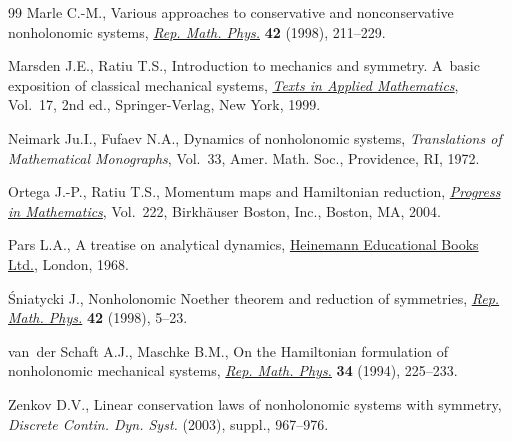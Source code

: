 \documentclass[pdftex]{sigma}
\numberwithin{equation}{section}
\begin{document}
\begin{thebibliography}{99}
Marle C.-M., Various approaches to conservative and nonconservative nonholonomic
  systems, \href{http://dx.doi.org/10.1016/S0034-4877(98)80011-6}{\textit{Rep. Math. Phys.}} \textbf{42} (1998), 211--229.

Marsden J.E., Ratiu T.S., Introduction to mechanics and symmetry. A~basic
  exposition of classical mechanical systems, \href{http://dx.doi.org/10.1007/978-0-387-21792-5}{\textit{Texts in Applied
  Mathematics}}, Vol.~17, 2nd ed., Springer-Verlag, New York, 1999.

Neimark Ju.I., Fufaev N.A., Dynamics of nonholonomic systems,
  \textit{Translations of Mathematical Monographs}, Vol.~33, Amer. Math. Soc.,
  Providence, RI, 1972.

Ortega J.-P., Ratiu T.S., Momentum maps and {H}amiltonian reduction,
  \href{http://dx.doi.org/10.1007/978-1-4757-3811-7}{\textit{Progress in Mathematics}}, Vol.~222, Birkh\"auser Boston, Inc.,
  Boston, MA, 2004.

Pars L.A., A treatise on analytical dynamics, \href{http://dx.doi.org/10.1007/978-1-4757-3811-7}{Heinemann Educational Books Ltd.},
  London, 1968.

{\'S}niatycki J., Nonholonomic {N}oether theorem and reduction of symmetries,
  \href{http://dx.doi.org/10.1016/S0034-4877(98)80002-5}{\textit{Rep. Math. Phys.}} \textbf{42} (1998), 5--23.

van~der Schaft A.J., Maschke B.M., On the {H}amiltonian formulation of
  nonholonomic mechanical systems, \href{http://dx.doi.org/10.1016/0034-4877(94)90038-8}{\textit{Rep. Math. Phys.}} \textbf{34}
  (1994), 225--233.

Zenkov D.V., Linear conservation laws of nonholonomic systems with symmetry,
  \textit{Discrete Contin. Dyn. Syst.}  (2003), suppl., 967--976.

\end{thebibliography}\LastPageEnding
\end{document}
